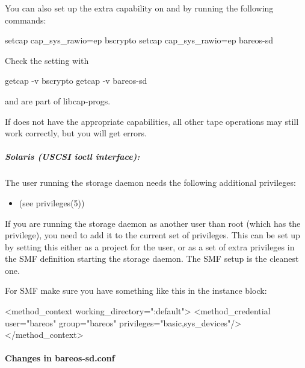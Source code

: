 You can also set up the extra capability on  and  by running the following commands:

\begin{commands}{}
setcap cap_sys_rawio=ep bscrypto
setcap cap_sys_rawio=ep bareos-sd
\end{commands}

Check the setting with

\begin{commands}{}
getcap -v bscrypto
getcap -v bareos-sd
\end{commands}

 and  are part of libcap-progs.

If  does not have the appropriate capabilities, all
other tape operations may still work correctly, but you will
get  errors.



\subparagraph{Solaris (USCSI ioctl interface):} The user running the storage daemon needs the following additional privileges:
\begin{itemize}
 \item {} (see privileges(5))
\end{itemize}

If you are running the storage daemon as another user than root (which has the  privilege), you need to add it to the current set of privileges.
This can be set up by setting this either as a project for the user, or as a set of extra privileges in the SMF definition starting the storage daemon. The SMF setup is the cleanest one.

For SMF make sure you have something like this in the instance block:

\begin{bconfig}{}
<method_context working_directory=":default"> <method_credential user="bareos" group="bareos" privileges="basic,sys_devices"/> </method_context>
\end{bconfig}

\paragraph{Changes in bareos-sd.conf}

